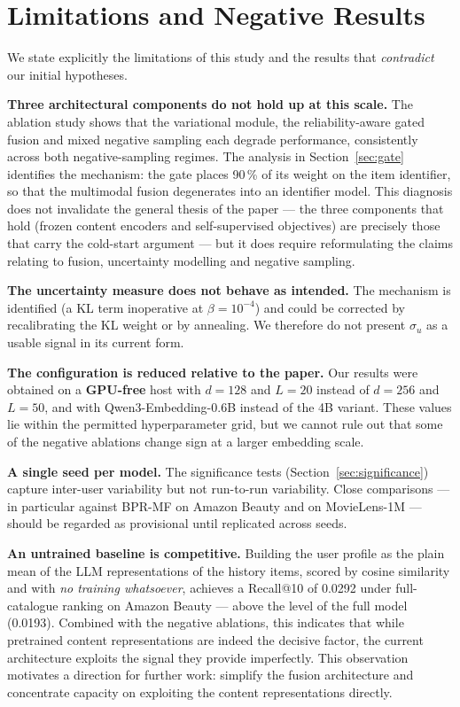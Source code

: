 \section{Limitations and Negative Results}
\label{sec:limitations}

We state explicitly the limitations of this study and the results that
\emph{contradict} our initial hypotheses.

\textbf{Three architectural components do not hold up at this scale.} The
ablation study shows that the variational module, the reliability-aware gated
fusion and mixed negative sampling each degrade performance, consistently across
both negative-sampling regimes. The analysis in Section~\ref{sec:gate} identifies
the mechanism: the gate places 90\,\% of its weight on the item identifier, so
that the multimodal fusion degenerates into an identifier model. This diagnosis
does not invalidate the general thesis of the paper --- the three components that
hold (frozen content encoders and self-supervised objectives) are precisely those
that carry the cold-start argument --- but it does require reformulating the
claims relating to fusion, uncertainty modelling and negative sampling.

\textbf{The uncertainty measure does not behave as intended.} The mechanism is
identified (a KL term inoperative at $\beta=10^{-4}$) and could be corrected by
recalibrating the KL weight or by annealing. We therefore do not present
$\sigma_u$ as a usable signal in its current form.

\textbf{The configuration is reduced relative to the paper.} Our results were
obtained on a \textbf{GPU-free} host with $d=128$ and $L=20$ instead of $d=256$
and $L=50$, and with Qwen3-Embedding-0.6B instead of the 4B variant. These values
lie within the permitted hyperparameter grid, but we cannot rule out that some of
the negative ablations change sign at a larger embedding scale.

\textbf{A single seed per model.} The significance tests
(Section~\ref{sec:significance}) capture inter-user variability but not
run-to-run variability. Close comparisons --- in particular against BPR-MF on
Amazon Beauty and on MovieLens-1M --- should be regarded as provisional until
replicated across seeds.

\textbf{An untrained baseline is competitive.} Building the user profile as the
plain mean of the LLM representations of the history items, scored by cosine
similarity and with \emph{no training whatsoever}, achieves a Recall@10 of
0.0292 under full-catalogue ranking on Amazon Beauty --- above the level of the
full model (0.0193). Combined with the negative ablations, this indicates that
while pretrained content representations are indeed the decisive factor, the
current architecture exploits the signal they provide imperfectly. This
observation motivates a direction for further work: simplify the fusion
architecture and concentrate capacity on exploiting the content representations
directly.

